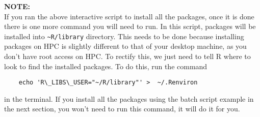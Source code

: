 \begin{story}
  \textbf{NOTE:}
  \\
  If you ran the above interactive script to install all the packages, once it is done there is one more command you will need to run. In this script, packages will be installed into \texttt{\textasciitilde R/library} directory. This needs to be done because installing packages on HPC is slightly different to that of your desktop machine, as you don't have root access on HPC. To rectify this, we just need to tell R where to look to find the installed packages. To do this, run the command
  \\
  \begin{verbatim}
    echo 'R\_LIBS\_USER="~/R/library"' >  ~/.Renviron
  \end{verbatim}
  in the terminal. If you install all the packages using the batch script example in the next section, you won't need to run this command, it will do it for you.
\end{story}
